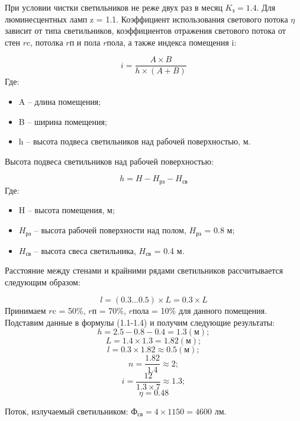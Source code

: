 При условии чистки светильников не реже двух раз в месяц $K_{\text{з}} = 1.4$. 
Для люминесцентных ламп z = 1.1. Коэффициент использования светового потока $\eta$ зависит от типа светильников,
коэффициентов отражения светового потока от стен $r{\text{c}}$, потолка $r{\text{п}}$ и пола $r{\text{пола}}$,
а также индекса помещения i:

\begin{equation}\label{eq:index}
    i = \dfrac{A \times B}{h \times (A + B)}
\end{equation}
Где:
\begin{itemize}
    \item A -- длина помещения;
    \item B -- ширина помещения;
    \item h -- высота подвеса светильников над рабочей поверхностью, м.
\end{itemize}

Высота подвеса светильников над рабочей поверхностью:

\begin{equation}\label{eq:high}
    h = H - H_{\text{рз}} - H_{\text{св}}
\end{equation}
Где:
\begin{itemize}
    \item H -- высота помещения, м;
    \item $H_{\text{рз}}$ -- высота рабочей поверхности над полом, $H_{\text{рз}}$ = 0.8 м;
    \item $H_{\text{св}}$ -- высота свеса светильника, $H_{\text{св}}$ = 0.4 м.
\end{itemize}

Расстояние между стенами и крайними рядами светильников рассчитывается следующим образом:

\begin{equation}\label{eq:length}
    l = (0.3 \ldots 0.5) \times L = 0.3 \times L
\end{equation}
Принимаем $r{\text{c}}$ = 50\%, $r{\text{п}}$ = 70\%,  $r{\text{пола}}$ = 10\% для данного помещения.
Подставим данные в формулы (1.1-1.4) и получим следующие результаты:
\[
    h = 2.5 - 0.8 - 0.4 = 1.3 (\text{м});
\]
\[
    L = 1.4 \times 1.3 = 1.82 (\text{м});
\]
\[
    l = 0.3 \times 1.82 \approx 0.5 (\text{м});
\]
\[
    n = \dfrac {1.82}{1.4} \approx 2;
\]
\[
    i = \dfrac {12}{1.3 \times 7} \approx 1.3;
\]
\[
    \eta = 0.48
\]

Поток, излучаемый светильником: ${\text{Ф}}_{\text{св}} = 4 \times 1150 = 4600$ лм.

